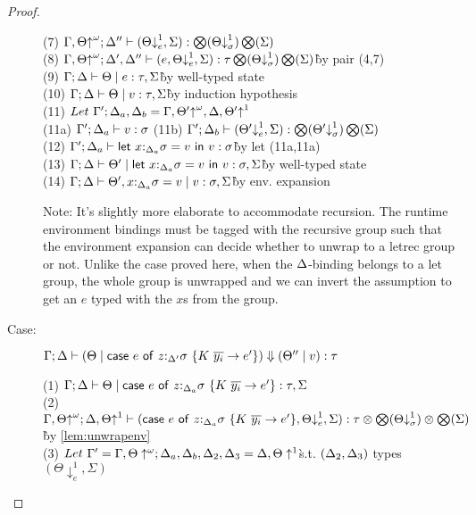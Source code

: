 \documentclass[acmsmall,review,screen]{acmart}
\newcommand{\llet}[2]{\mathsf{let}~#1~\mathsf{in}~#2}
\newcommand{\ccase}[2]{\mathsf{case}~#1~\mathsf{of}~#2}
\begin{document}
\begin{proof}
\begin{description}
\begin{tabbing}
    (7) $\Gamma, \Theta{\uparrow}^\omega; \Delta'' \vdash (\Theta{\downarrow}^1_e, \Sigma) : \bigotimes(\Theta{\downarrow}^1_\sigma) \bigotimes(\Sigma)$\\
    (8) $\Gamma, \Theta{\uparrow}^\omega; \Delta', \Delta'' \vdash (e, \Theta{\downarrow}^1_e, \Sigma) : \tau \bigotimes(\Theta{\downarrow}^1_\sigma) \bigotimes(\Sigma)$\` by pair (4,7)\\
    (9) $\Gamma; \Delta \vdash \Theta \mid e : \tau,\Sigma$\` by well-typed state\\
    (10) $\Gamma; \Delta \vdash \Theta \mid v : \tau,\Sigma$\` by induction hypothesis\\
    (11) $Let~\Gamma';\Delta_a,\Delta_b = \Gamma, \Theta'{\uparrow}^\omega, \Delta, \Theta'{\uparrow}^1$\\
    (11a) $\Gamma'; \Delta_a \vdash v : \sigma$
    (11b) $\Gamma'; \Delta_b \vdash (\Theta'{\downarrow}^1_e, \Sigma) : \bigotimes(\Theta'{\downarrow}^1_\sigma) \bigotimes(\Sigma)$\\
    (12) $\G'; \D_a \vdash \llet{x{:}_{\D_a}\s = v}{v} : \s$\`by let (11a,11a)\\
    (13) $\G; \D \vdash \Theta' \mid \llet{x{:}_{\D_a}\s = v}{v} : \s, \Sigma$\`by well-typed state\\
    (14) $\Gamma; \Delta \vdash \Theta', x{:}_{\Delta_a}\sigma = v \mid v : \sigma, \Sigma$\`by env. expansion\\
\end{tabbing}
Note: It's slightly more elaborate to accommodate recursion. The runtime
environment bindings must be tagged with the recursive group such that the
environment expansion can decide whether to unwrap to a letrec group or
not. Unlike the case proved here, when the $\Delta$-binding belongs to a let group,
the whole group is unwrapped and we can invert the assumption to get an
$e$ typed with the $x$s from the group.\\
\item[Case:] $\Gamma; \Delta \vdash (\Theta \mid \ccase{e}{z{:}_{\Delta'}\s~\{K~\ov{y_i}\to e'}\}) \Downarrow (\Theta'' \mid v) : \tau$
\begin{tabbing}
    (1) $\Gamma; \Delta \vdash \Theta \mid \ccase{e}{z{:}_{\Delta_a}\s~\{K~\ov{y_i}\to e'}\} : \tau, \Sigma$\\
    (2) $\G, \Theta{\uparrow}^\omega; \D, \Theta{\uparrow}^1 \vdash (\ccase{e}{z{:}_{\Delta_a}\s~\{K~\ov{y_i}\to e'}\}, \Theta{\downarrow}^1_e, \Sigma) : \tau \otimes \bigotimes(\Theta{\downarrow}^1_\sigma) \otimes \bigotimes(\Sigma)$\`by \ref{lem:unwrapenv}\\
    (3) $Let~\Gamma' = \Gamma, \Theta\uparrow^\omega; \Delta_a,\Delta_b,\Delta_2,\Delta_3 = \Delta,\Theta\uparrow^1$\`s.t. $(\Delta_2,\Delta_3)$ types $(\Theta\downarrow^1_e, \Sigma)$\\

\end{tabbing}
\end{description}
\end{proof}
\end{document}
